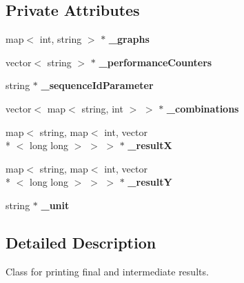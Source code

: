 \subsection*{Private Attributes}
\begin{DoxyCompactItemize}
\item 
\hypertarget{classPrinter_aca7fa1a5f165bf18a2dd0516289e64e4}{map$<$ int, string $>$ $\ast$ {\bfseries \-\_\-graphs}}\label{classPrinter_aca7fa1a5f165bf18a2dd0516289e64e4}

\item 
\hypertarget{classPrinter_aac65f72085f737c506b6b7cd275d09e6}{vector$<$ string $>$ $\ast$ {\bfseries \-\_\-performance\-Counters}}\label{classPrinter_aac65f72085f737c506b6b7cd275d09e6}

\item 
\hypertarget{classPrinter_ac47423e351473e2a3ca90b9d3917be6f}{string $\ast$ {\bfseries \-\_\-sequence\-Id\-Parameter}}\label{classPrinter_ac47423e351473e2a3ca90b9d3917be6f}

\item 
\hypertarget{classPrinter_afcf92fe71d8c3ad38ea83e74cbad2d9c}{vector$<$ map$<$ string, int $>$ $>$ $\ast$ {\bfseries \-\_\-combinations}}\label{classPrinter_afcf92fe71d8c3ad38ea83e74cbad2d9c}

\item 
\hypertarget{classPrinter_a3144e1039dfed5e4559decb668ab415e}{map$<$ string, map$<$ int, vector\\*
$<$ long long $>$ $>$ $>$ $\ast$ {\bfseries \-\_\-result\-X}}\label{classPrinter_a3144e1039dfed5e4559decb668ab415e}

\item 
\hypertarget{classPrinter_a3a334174a18285eb33585170d71a5e12}{map$<$ string, map$<$ int, vector\\*
$<$ long long $>$ $>$ $>$ $\ast$ {\bfseries \-\_\-result\-Y}}\label{classPrinter_a3a334174a18285eb33585170d71a5e12}

\item 
\hypertarget{classPrinter_a23cb6e8c5a08627d635c361af1119208}{string $\ast$ {\bfseries \-\_\-unit}}\label{classPrinter_a23cb6e8c5a08627d635c361af1119208}

\end{DoxyCompactItemize}


\subsection{Detailed Description}
Class for printing final and intermediate results. 

